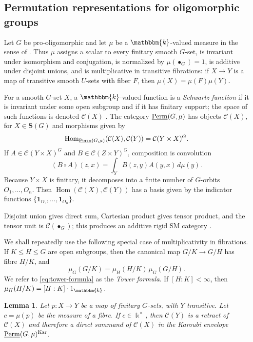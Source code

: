 \documentclass[11pt,a4paper]{amsart}
\theoremstyle{plain}%
\newtheorem{lemma}{Lemma}[subsection]
\theoremstyle{definition}
\theoremstyle{remark}
\newcommand{\Hom}{\operatorname{Hom}}
\newcommand{\Perm}{\underline{{\rm Perm}}}
\newcommand{\kk}{\mathbbm{k}}
\newcommand{\one}{{\mathbf{1}}}
\newcommand{\Kar}{\mathrm{Kar}}
\newcommand{\cC}{\mathcal{C}}
\begin{document}


\subsection{Permutation representations for oligomorphic groups}
Let $G$ be pro-oligomorphic and let $\mu$ be a $\kk$-valued measure in the sense of \cite[Definition 3.1]{HS-oligomorphic}. Thus $\mu$ assigns a scalar to every finitary smooth $G$-set, is invariant under isomorphism and conjugation, is normalized by $\mu(\bullet_G)=1$, is additive under disjoint unions, and is multiplicative in transitive fibrations: if $X\to Y$ is a map of transitive smooth $U$-sets with fiber $F$, then $\mu(X)=\mu(F)\mu(Y)$.

For a smooth $G$-set $X$, a $\kk$-valued function is a \emph{Schwartz function} if it is invariant under some open subgroup and if it has finitary support; the space of such functions is denoted $\cC(X)$ \cite[\S4.2]{HS-oligomorphic}. The category $\Perm(G,\mu)$ has objects $\mathcal{C}(X)$, for $X \in \mathbf{S}(G)$ and morphisms given by
\[
\Hom_{\Perm(G,\mu)}(\mathcal{C}(X),\mathcal{C}(Y))=\cC(Y\times X)^G.
\]
If $A\in\cC(Y\times X)^G$ and $B\in\cC(Z\times Y)^G$, composition is convolution
\[
(B\circ A)(z,x)=\int_Y B(z,y)A(y,x)\,d\mu(y).
\]
Because $Y \times X$ is finitary, it decomposes into a finite number of $G$-orbits $O_1, \dots, O_n$. Then $\Hom(\mathcal{C}(X), \mathcal{C}(Y))$ has a basis given by the indicator functions $\{\one_{O_1}, \dots, \one_{O_n}\}$.

Disjoint union gives direct sum, Cartesian product gives tensor product, and the tensor unit is $\mathcal{C}(\bullet_G)$; this produces an additive rigid SM category \cite[Definition 8.1 and Propositions 8.2--8.3]{HS-oligomorphic}.

We shall repeatedly use the following special case of multiplicativity in
fibrations. If $K\leq H\leq G$ are open subgroups, then the canonical map
$G/K\to G/H$ has fibre $H/K$, and
\begin{equation}\label{eq:tower-formula}
  \mu_G(G/K)=\mu_H(H/K)\,\mu_G(G/H).
\end{equation}
We refer to \eqref{eq:tower-formula} as the \emph{Tower formula}. If
$[H:K]<\infty$, then $\mu_H(H/K)=[H:K]\cdot 1_\kk$.


\begin{lemma}\label{lem:fibre-splitting}
Let $p:X\to Y$ be a map of finitary $G$-sets, with $Y$ transitive. Let
$c = \mu(p)$ be the measure of a fibre. If $c\in\Bbbk^\times$, then
$\mathcal{C}(Y)$ is a retract of $\mathcal{C}(X)$ and therefore a direct summand of $\mathcal{C}(X)$ in the Karoubi envelope $\Perm(G, \mu)^{\Kar}$.
\end{lemma}
\end{document}
